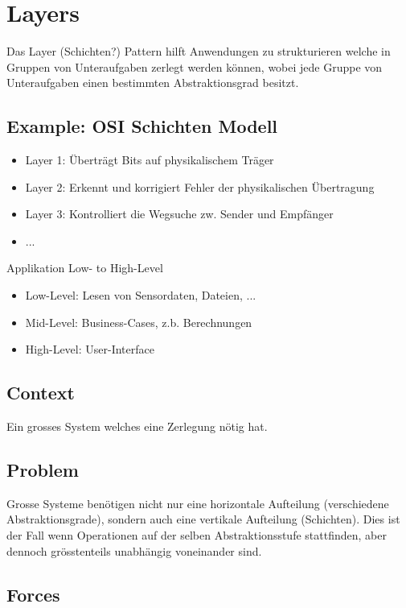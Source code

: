 \section{Layers}

Das Layer (Schichten?) Pattern hilft Anwendungen zu strukturieren welche in Gruppen von Unteraufgaben zerlegt werden können, wobei jede Gruppe von Unteraufgaben einen bestimmten Abstraktionsgrad besitzt.

\subsection*{Example: OSI Schichten Modell}

\begin{itemize}
	\item Layer 1: Überträgt Bits auf physikalischem Träger
	\item Layer 2: Erkennt und korrigiert Fehler der physikalischen Übertragung
	\item Layer 3: Kontrolliert die Wegsuche zw. Sender und Empfänger
	\item ...
\end{itemize}

Applikation Low- to High-Level

\begin{itemize}
	\item Low-Level: Lesen von Sensordaten, Dateien, ...
	\item Mid-Level: Business-Cases, z.b. Berechnungen
	\item High-Level: User-Interface
\end{itemize}

\subsection*{Context}

Ein grosses System welches eine Zerlegung nötig hat.

\subsection*{Problem}


Grosse Systeme benötigen nicht nur eine horizontale Aufteilung (verschiedene Abstraktionsgrade), sondern auch eine vertikale Aufteilung (Schichten). Dies ist der Fall wenn Operationen auf der selben Abstraktionsstufe stattfinden, aber dennoch grösstenteils unabhängig voneinander sind.

\subsection*{Forces}


